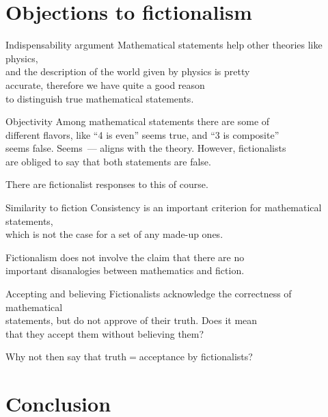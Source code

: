 \documentclass[12pt,aspectratio=169,svgnames]{beamer}
\begin{document}
\section{Objections to fictionalism}

\begin{frame}{Indispensability argument}
	Mathematical statements help other theories like physics, \\
	and the description of the world given by physics is pretty \\
	accurate, therefore we have quite a good reason \\
	to distinguish true mathematical statements.
\end{frame}

\begin{frame}{Objectivity}
	Among mathematical statements there are some of \\
	different flavors, like “4 is even” seems true, and “3 is composite” \\
	seems false. Seems~— aligns with the theory. However, fictionalists \\
	are obliged to say that both statements are false. \bigskip

	\textcolor{black!35!white}{
		There are fictionalist responses to this of course.}
\end{frame}

\begin{frame}{Similarity to fiction}
	Consistency is an important criterion for mathematical statements, \\
	which is not the case for a set of any made-up ones. \bigskip

	\textcolor{black!35!white}{
		Fictionalism does not involve the claim that there are no \\
		important disanalogies between mathematics and fiction.}
\end{frame}

\begin{frame}{Accepting and believing}
	Fictionalists acknowledge the correctness of mathematical \\
	statements, but do not approve of their truth. Does it mean \\
	that they accept them without believing them? \bigskip

	Why not then say that truth\(=\)acceptance by fictionalists?
\end{frame}

\section{Conclusion}
\end{document}
